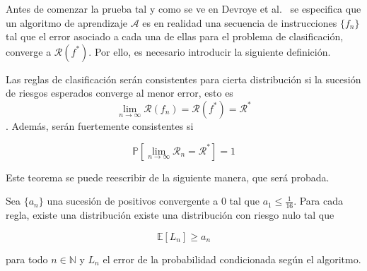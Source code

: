 Antes de comenzar la prueba tal y como se ve en Devroye et al.~\cite{demoNFL} se especifica que un algoritmo de aprendizaje $\mathcal{A}$ es en realidad una secuencia de instrucciones $\{f_n\}$ tal que el error asociado a cada una de ellas para el problema de clasificación, converge a $\mathcal{R}(f^*)$. Por ello, es necesario introducir la siguiente definición.

\begin{definicion}
Las reglas de clasificación serán consistentes para cierta distribución si la sucesión de riesgos esperados converge al menor error, esto es
$$\lim_{n \to \infty} \mathcal{R}(f_n) = \mathcal{R}(f^*)=\mathcal{R}^*$$.
Además, serán fuertemente consistentes si 

$$\mathbb{P}[\lim_{n \to \infty} \mathcal{R}_n = \mathcal{R}^*] = 1$$
\end{definicion}

Este teorema se puede reescribir de la siguiente manera, que será probada.

Sea $\{a_n\}$ una sucesión de positivos convergente a $0$ tal que $a_1 \leq \frac{1}{16}$. Para cada regla, existe una distribución existe una distribución con riesgo nulo tal que 

$$\mathbb{E}[L_n] \geq a_n$$

para todo $n \in \mathbb{N}$ y $L_n$ el error de la probabilidad condicionada según el algoritmo.

